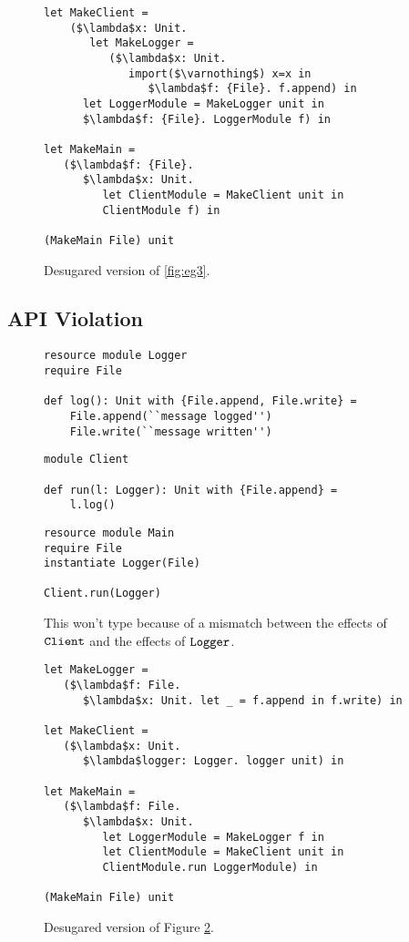 \begin{figure}[h]

\begin{lstlisting}
let MakeClient =
	($\lambda$x: Unit.
	   let MakeLogger =
	      ($\lambda$x: Unit.
	         import($\varnothing$) x=x in
	            $\lambda$f: {File}. f.append) in
      let LoggerModule = MakeLogger unit in
      $\lambda$f: {File}. LoggerModule f) in
	
let MakeMain =
   ($\lambda$f: {File}.
      $\lambda$x: Unit.
         let ClientModule = MakeClient unit in
         ClientModule f) in

(MakeMain File) unit
\end{lstlisting}

\caption{Desugared version of \ref{fig:eg3}.}
\label{fig:eg3_desugared}
\end{figure}


\subsection{API Violation}


\begin{figure}[h]

\begin{lstlisting}
resource module Logger
require File

def log(): Unit with {File.append, File.write} =
    File.append(``message logged'')
    File.write(``message written'')
\end{lstlisting}

\begin{lstlisting}
module Client

def run(l: Logger): Unit with {File.append} =
    l.log()
\end{lstlisting}

\begin{lstlisting}
resource module Main
require File
instantiate Logger(File)

Client.run(Logger)
\end{lstlisting}

\caption{This won't type because of a mismatch between the effects of $\mathtt{Client}$ and the effects of $\mathtt{Logger}$.}
\label{fig:eg4}
\end{figure}


\begin{figure}[h]

\begin{lstlisting}
let MakeLogger =
   ($\lambda$f: File.
      $\lambda$x: Unit. let _ = f.append in f.write) in
           
let MakeClient =
   ($\lambda$x: Unit.
      $\lambda$logger: Logger. logger unit) in
                  
let MakeMain =
   ($\lambda$f: File.
      $\lambda$x: Unit.
         let LoggerModule = MakeLogger f in
         let ClientModule = MakeClient unit in
         ClientModule.run LoggerModule) in

(MakeMain File) unit
\end{lstlisting}

\caption{Desugared version of Figure \ref{fig:eg4}.}
\label{fig:eg4_desugared}
\end{figure}


